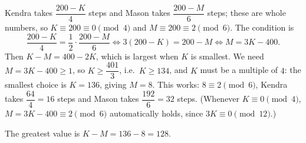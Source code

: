 Kendra takes $\dfrac{200-K}{4}$ steps and Mason takes $\dfrac{200-M}{6}$ steps; these are whole numbers, so $K\equiv200\equiv0\pmod 4$ and $M\equiv200\equiv2\pmod 6$. The condition is
\[
\dfrac{200-K}{4}=\dfrac{1}{2}\cdot\dfrac{200-M}{6}\iff3(200-K)=200-M\iff M=3K-400 .
\]
Then $K-M=400-2K$, which is largest when $K$ is smallest. We need $M=3K-400\ge1$, so $K\ge\dfrac{401}{3}$, i.e.\ $K\ge134$, and $K$ must be a multiple of $4$: the smallest choice is $K=136$, giving $M=8$. This works: $8\equiv2\pmod6$, Kendra takes $\dfrac{64}{4}=16$ steps and Mason takes $\dfrac{192}{6}=32$ steps. (Whenever $K\equiv0\pmod4$, $M=3K-400\equiv2\pmod 6$ automatically holds, since $3K\equiv0\pmod{12}$.)

The greatest value is $K-M=136-8=\boxed{128}$.
